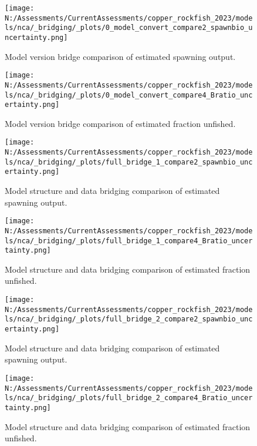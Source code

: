 \documentclass[11pt,
  english,
  letterpaper,
]{article}
\begin{document}
\begin{figure}
\centering
\texttt{[image: N:/Assessments/CurrentAssessments/copper\_rockfish\_2023/models/nca/\_bridging/\_plots/0\_model\_convert\_compare2\_spawnbio\_uncertainty.png]}
\caption{Model version bridge comparison of estimated spawning output.\label{fig:bridge-ssb}}
\end{figure}

\begin{figure}
\centering
\texttt{[image: N:/Assessments/CurrentAssessments/copper\_rockfish\_2023/models/nca/\_bridging/\_plots/0\_model\_convert\_compare4\_Bratio\_uncertainty.png]}
\caption{Model version bridge comparison of estimated fraction unfished.\label{fig:bridge-depl}}
\end{figure}

\begin{figure}
\centering
\texttt{[image: N:/Assessments/CurrentAssessments/copper\_rockfish\_2023/models/nca/\_bridging/\_plots/full\_bridge\_1\_compare2\_spawnbio\_uncertainty.png]}
\caption{Model structure and data bridging comparison of estimated spawning output.\label{fig:data-bridge-ssb-1}}
\end{figure}

\begin{figure}
\centering
\texttt{[image: N:/Assessments/CurrentAssessments/copper\_rockfish\_2023/models/nca/\_bridging/\_plots/full\_bridge\_1\_compare4\_Bratio\_uncertainty.png]}
\caption{Model structure and data bridging comparison of estimated fraction unfished.\label{fig:data-bridge-depl-1}}
\end{figure}

\begin{figure}
\centering
\texttt{[image: N:/Assessments/CurrentAssessments/copper\_rockfish\_2023/models/nca/\_bridging/\_plots/full\_bridge\_2\_compare2\_spawnbio\_uncertainty.png]}
\caption{Model structure and data bridging comparison of estimated spawning output.\label{fig:data-bridge-ssb-2}}
\end{figure}

\begin{figure}
\centering
\texttt{[image: N:/Assessments/CurrentAssessments/copper\_rockfish\_2023/models/nca/\_bridging/\_plots/full\_bridge\_2\_compare4\_Bratio\_uncertainty.png]}
\caption{Model structure and data bridging comparison of estimated fraction unfished.\label{fig:data-bridge-depl-2}}
\end{figure}
\end{document}
